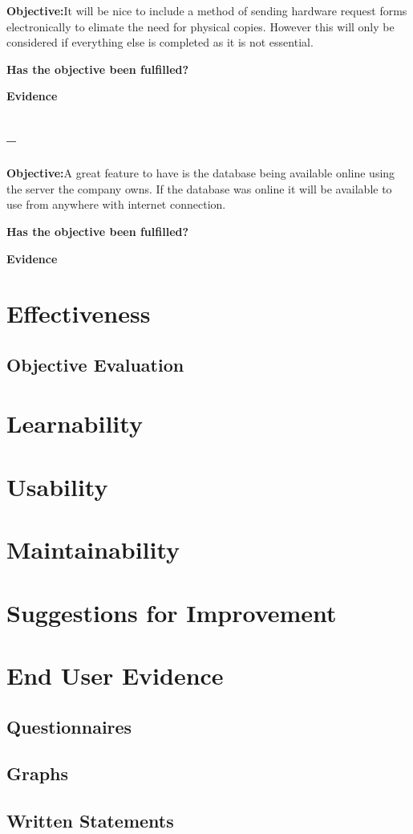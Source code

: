 \textbf{Objective:}It will be nice to include a method of sending hardware request forms electronically to elimate the need for physical copies. However this will only be considered if everything else is completed as it is not essential.

\textbf{Has the objective been fulfilled?}

\textbf{Evidence}



\subsection{--}

\textbf{Objective:}A great feature to have is the database being available online using the server the company owns. If the database was online it will be available to use from anywhere with internet connection.

\textbf{Has the objective been fulfilled?}

\textbf{Evidence}





\section{Effectiveness}

\subsection{Objective Evaluation}

\section{Learnability}

\section{Usability}

\section{Maintainability}

\section{Suggestions for Improvement}

\section{End User Evidence}

\subsection{Questionnaires}

\subsection{Graphs}

\subsection{Written Statements}

